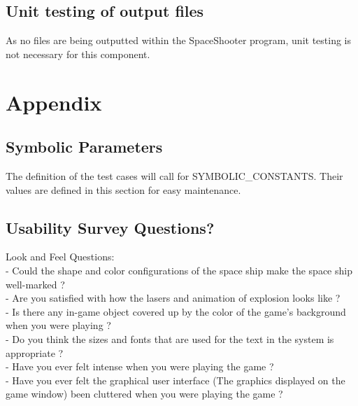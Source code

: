 \documentclass[12pt, titlepage]{article}
\begin{document}
		
\subsection{Unit testing of output files}		
As no files are being outputted within the SpaceShooter program, unit testing is not necessary for this component. 






\newpage

\section{Appendix}

\subsection{Symbolic Parameters}

The definition of the test cases will call for SYMBOLIC\_CONSTANTS.
Their values are defined in this section for easy maintenance.

\subsection{Usability Survey Questions?}
Look and Feel Questions:\\
- Could the shape and color configurations of the space ship make the space ship well-marked ?\\
- Are you satisfied with how the lasers and animation of explosion looks like ?\\
- Is there any in-game object covered up by the color of the game's background when you were playing ?\\
- Do you think the sizes and fonts that are used for the text in the system is appropriate ?\\
- Have you ever felt intense when you were playing the game ?\\
- Have you ever felt the graphical user interface (The graphics displayed on the game window) been cluttered when you were playing the game ?\\
\end{document}
